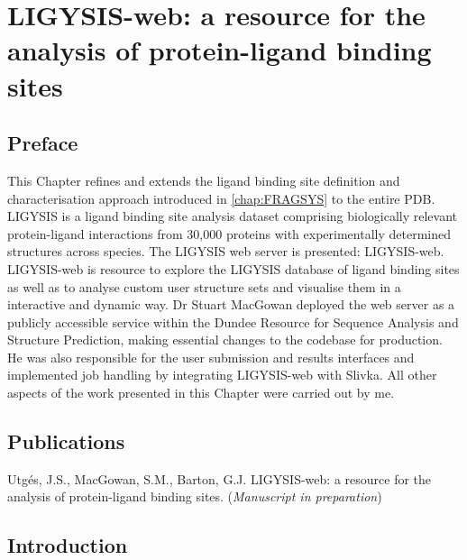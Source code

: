 \chapter{LIGYSIS-web: a resource for the analysis of protein-ligand binding sites}
\label{chap:LIGYSIS_WEB}

\section*{Preface}

This Chapter refines and extends the ligand binding site definition and characterisation approach introduced in \autoref{chap:FRAGSYS} to the entire PDB. LIGYSIS is a ligand binding site analysis dataset comprising biologically relevant protein-ligand interactions from 30,000 proteins with experimentally determined structures across species. The LIGYSIS web server is presented: LIGYSIS-web. LIGYSIS-web is resource to explore the LIGYSIS database of ligand binding sites as well as to analyse custom user structure sets and visualise them in a interactive and dynamic way. Dr Stuart MacGowan deployed the web server as a publicly accessible service within the Dundee Resource for Sequence Analysis and Structure Prediction, making essential changes to the codebase for production. He was also responsible for the user submission and results interfaces and implemented job handling by integrating LIGYSIS-web with Slivka. All other aspects of the work presented in this Chapter were carried out by me.

\section*{Publications}

Utgés, J.S., MacGowan, S.M., Barton, G.J. LIGYSIS-web: a resource for the analysis of protein-ligand binding sites. (\textit{Manuscript in preparation})



\section{Introduction}

